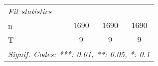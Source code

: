 \begin{tabular}{lccc}
   \midrule
   \emph{Fit statistics}                                                                              \\
   n                                   & $1690$                     & $1690$           & $1690$       \\
   T                                   & $9$                        & $9$              & $9$          \\
   \midrule \midrule
   \multicolumn{4}{l}{\emph{Signif. Codes: ***: 0.01, **: 0.05, *: 0.1}}                              \\
\end{tabular}
\par\endgroup

